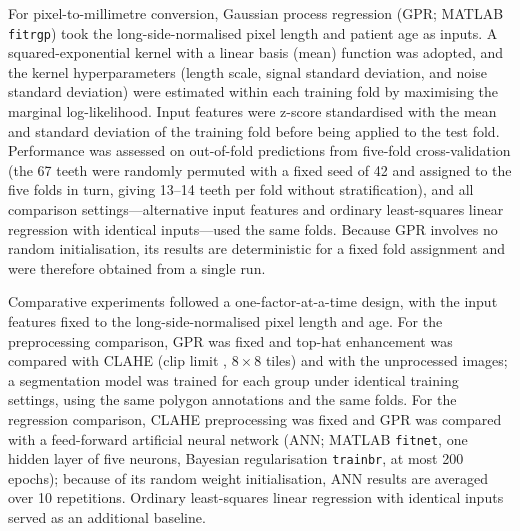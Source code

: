 For pixel-to-millimetre conversion, Gaussian process regression (GPR; MATLAB
\texttt{fitrgp}) took the long-side-normalised pixel length and patient age as
inputs. A squared-exponential kernel with a linear basis (mean) function was
adopted, and the kernel hyperparameters (length scale, signal standard
deviation, and noise standard deviation) were estimated within each training
fold by maximising the marginal log-likelihood. Input features were z-score
standardised with the mean and standard deviation of the training fold before
being applied to the test fold. Performance was assessed on out-of-fold
predictions from five-fold cross-validation (the 67 teeth were randomly permuted with a fixed seed of 42 and assigned to the five folds in turn, giving 13--14 teeth per fold without stratification), and all comparison settings---alternative input
features and ordinary least-squares linear regression with identical
inputs---used the same folds.
Because GPR involves no random initialisation, its results are deterministic for
a fixed fold assignment and were therefore obtained from a single run.

Comparative experiments followed a one-factor-at-a-time design, with the input
features fixed to the long-side-normalised pixel length and age. For the
preprocessing comparison, GPR was fixed and top-hat enhancement was compared with
CLAHE (clip limit \tbd{}, $8\times8$ tiles) and with the unprocessed images; a
segmentation model was trained for each group under identical training settings,
using the same polygon annotations and the same folds. For the regression
comparison, CLAHE preprocessing was fixed and GPR was compared with a
feed-forward artificial neural network (ANN; MATLAB \texttt{fitnet}, one hidden
layer of five neurons, Bayesian regularisation \texttt{trainbr}, at most 200
epochs); because of its random weight initialisation, ANN results are averaged
over 10 repetitions. Ordinary least-squares linear regression with identical
inputs served as an additional baseline.


